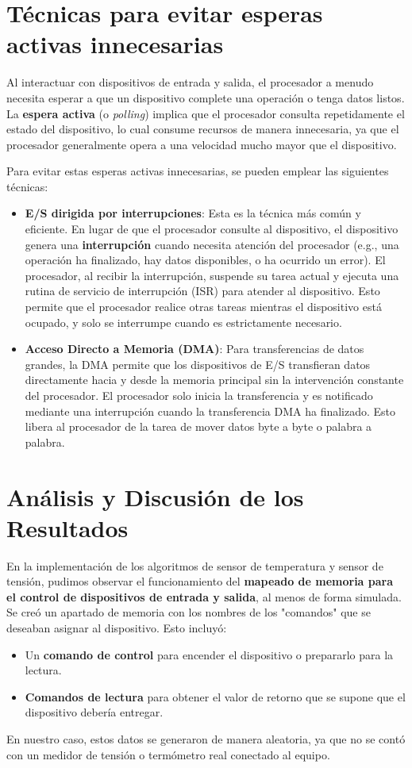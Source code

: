\documentclass{article}
\begin{document}
	\section{Técnicas para evitar esperas activas innecesarias}
	
	Al interactuar con dispositivos de entrada y salida, el procesador a menudo necesita esperar a que un dispositivo complete una operación o tenga datos listos. La \textbf{espera activa} (o \textit{polling}) implica que el procesador consulta repetidamente el estado del dispositivo, lo cual consume recursos de manera innecesaria, ya que el procesador generalmente opera a una velocidad mucho mayor que el dispositivo.
	
	Para evitar estas esperas activas innecesarias, se pueden emplear las siguientes técnicas:
	\begin{itemize}
		\item \textbf{E/S dirigida por interrupciones}: Esta es la técnica más común y eficiente. En lugar de que el procesador consulte al dispositivo, el dispositivo genera una \textbf{interrupción} cuando necesita atención del procesador (e.g., una operación ha finalizado, hay datos disponibles, o ha ocurrido un error). El procesador, al recibir la interrupción, suspende su tarea actual y ejecuta una rutina de servicio de interrupción (ISR) para atender al dispositivo. Esto permite que el procesador realice otras tareas mientras el dispositivo está ocupado, y solo se interrumpe cuando es estrictamente necesario.
		\item \textbf{Acceso Directo a Memoria (DMA)}: Para transferencias de datos grandes, la DMA permite que los dispositivos de E/S transfieran datos directamente hacia y desde la memoria principal sin la intervención constante del procesador. El procesador solo inicia la transferencia y es notificado mediante una interrupción cuando la transferencia DMA ha finalizado. Esto libera al procesador de la tarea de mover datos byte a byte o palabra a palabra.
	\end{itemize}
	
	\section{Análisis y Discusión de los Resultados}
	
	En la implementación de los algoritmos de sensor de temperatura y sensor de tensión, pudimos observar el funcionamiento del \textbf{mapeado de memoria para el control de dispositivos de entrada y salida}, al menos de forma simulada. Se creó un apartado de memoria con los nombres de los "comandos" que se deseaban asignar al dispositivo. Esto incluyó:
	\begin{itemize}
		\item Un \textbf{comando de control} para encender el dispositivo o prepararlo para la lectura.
		\item \textbf{Comandos de lectura} para obtener el valor de retorno que se supone que el dispositivo debería entregar.
	\end{itemize}
	En nuestro caso, estos datos se generaron de manera aleatoria, ya que no se contó con un medidor de tensión o termómetro real conectado al equipo.
	
\end{document}
